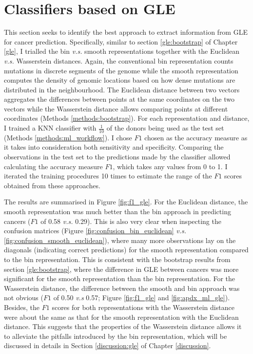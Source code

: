 \section{Classifiers based on GLE}\label{ml:gle}
This section seeks to identify the best approach to extract information from GLE for cancer prediction. Specifically, similar to section \ref{gle:bootstrap} of Chapter \ref{gle}, I trialled the bin \textit{v.s.} smooth representations together with the Euclidean \textit{v.s.} Wasserstein distances. Again, the conventional bin representation counts mutations in discrete segments of the genome while the smooth representation computes the density of genomic locations based on how dense mutations are distributed in the neighbourhood. The Euclidean distance between two vectors aggregates the differences between points at the same coordinates on the two vectors while the Wasserstein distance allows comparing points at different coordinates (Methods \ref{methods:bootstrap}). For each representation and distance, I trained a KNN classifier with $\frac{1}{10}$ of the donors being used as the test set (Methods \ref{methods:ml_workflow}). I chose $F1$ chosen as the accuracy measure as it takes into consideration both sensitivity and specificity. Comparing the observations in the test set to the predictions made by the classifier allowed calculating the accuracy measure $F1$, which takes any values from 0 to 1. I iterated the training procedures 10 times to estimate the range of the $F1$ scores obtained from these approaches. 

The results are summarised in Figure \ref{fig:f1_gle}. For the Euclidean distance, the smooth representation was much better than the bin approach in predicting cancers ($F1$ of 0.58 \textit{v.s.} 0.29). This is also very clear when inspecting the confusion matrices (Figure \ref{fig:confusion_bin_euclidean} \textit{v.s.} \ref{fig:confusion_smooth_euclidean}), where many more observations lay on the diagonals (indicating correct predictions) for the smooth representation compared to the bin representation. This is consistent with the bootstrap results from section \ref{gle:bootstrap}, where the difference in GLE between cancers was more significant for the smooth representation than the bin representation. For the Wasserstein distance, the difference between the smooth and bin approach was not obvious ($F1$ of 0.50 \textit{v.s} 0.57; Figure \ref{fig:f1_gle} and \ref{fig:apdx_ml_gle}). Besides, the $F1$ scores for both representations with the Wasserstein distance were about the same as that for the smooth representation with the Euclidean distance. This suggests that the properties of the Wasserstein distance allows it to alleviate the pitfalls introduced by the bin representation, which will be discussed in details in Section \ref{discussion:gle} of Chapter \ref{discussion}. 

